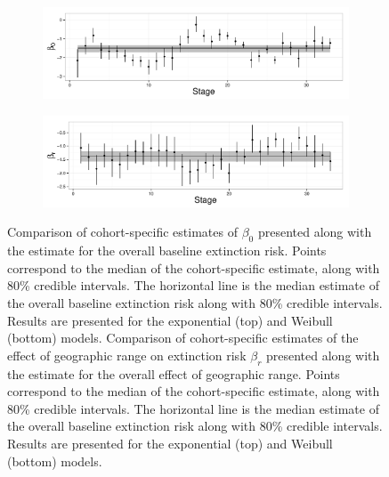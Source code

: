 \documentclass{article}
\begin{document}
\begin{figure}[ht]
  \centering
  \begin{subfigure}[b]{\textwidth}
    \caption{}
    \includegraphics[width = \textwidth,keepaspectratio=true]{figure/intercept_cohort}
    \label{fig:cohort_intercept}
  \end{subfigure}

  \begin{subfigure}[b]{\textwidth}
    \caption{}
    \includegraphics[width = \textwidth,keepaspectratio=true]{figure/range_cohort}
    \label{fig:cohort_range}
  \end{subfigure}
  \caption{Comparison of cohort-specific estimates of \(\beta_{0}\) presented along with the estimate for the overall baseline extinction risk. Points correspond to the median of the cohort-specific estimate, along with 80\% credible intervals. The horizontal line is the median estimate of the overall baseline extinction risk along with 80\% credible intervals. Results are presented for the exponential (top) and Weibull (bottom) models. Comparison of cohort-specific estimates of the effect of geographic range on extinction risk \(\beta_{r}\) presented along with the estimate for the overall effect of geographic range. Points correspond to the median of the cohort-specific estimate, along with 80\% credible intervals. The horizontal line is the median estimate of the overall baseline extinction risk along with 80\% credible intervals. Results are presented for the exponential (top) and Weibull (bottom) models.}
  \label{fig:cohort_info}
\end{figure}
\end{document}
